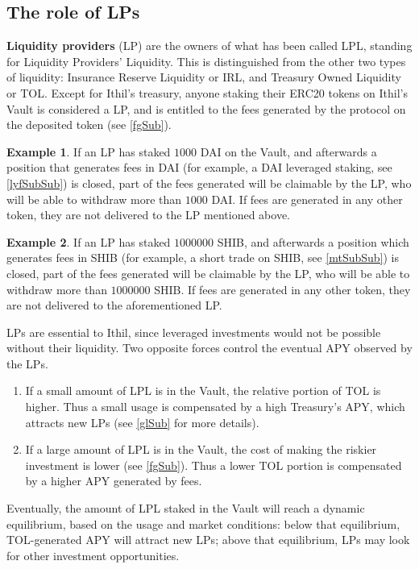\documentclass[a4paper,10 pt]{article}
\theoremstyle{definition}
\newtheorem{example}{Example}
\begin{document}
\subsection{The role of LPs}\label{lpSub}
{\bf Liquidity providers} (LP) are the owners of what has been called LPL, standing for Liquidity Providers' Liquidity. This is distinguished from the other two types of liquidity: Insurance Reserve Liquidity or IRL, and Treasury Owned Liquidity or TOL. Except for Ithil's treasury, anyone staking their ERC20 tokens on Ithil's Vault is considered a LP, and is entitled to the fees generated by the protocol on the deposited token (see \ref{fgSub}).

\begin{example}
If an LP has staked $1000$ DAI on the Vault, and afterwards a position that generates fees in DAI (for example, a DAI leveraged staking, see \ref{lyfSubSub}) is closed, part of the fees generated will be claimable by the LP, who will be able to withdraw more than $1000$ DAI. If fees are generated in any other token, they are not delivered to the LP mentioned above.
\end{example}

\begin{example}
If an LP has staked $1000000$ SHIB, and afterwards a position which generates fees in SHIB (for example, a short trade on SHIB, see \ref{mtSubSub}) is closed, part of the fees generated will be claimable by the LP, who will be able to withdraw more than $1000000$ SHIB. If fees are generated in any other token, they are not delivered to the aforementioned LP. 
\end{example}

LPs are essential to Ithil, since leveraged investments would not be possible without their liquidity. Two opposite forces control the eventual APY observed by the LPs.
\begin{enumerate}
\item If a small amount of LPL is in the Vault, the relative portion of TOL is higher. Thus a small usage is compensated by a high Treasury's APY, which attracts new LPs (see \ref{glSub} for more details).
\item If a large amount of LPL is in the Vault, the cost of making the riskier investment is lower (see \ref{fgSub}). Thus a lower TOL portion is compensated by a higher APY generated by fees.
\end{enumerate}

Eventually, the amount of LPL staked in the Vault will reach a dynamic equilibrium, based on the usage and market conditions: below that equilibrium, TOL-generated APY will attract new LPs; above that equilibrium, LPs may look for other investment opportunities.
\end{document}
